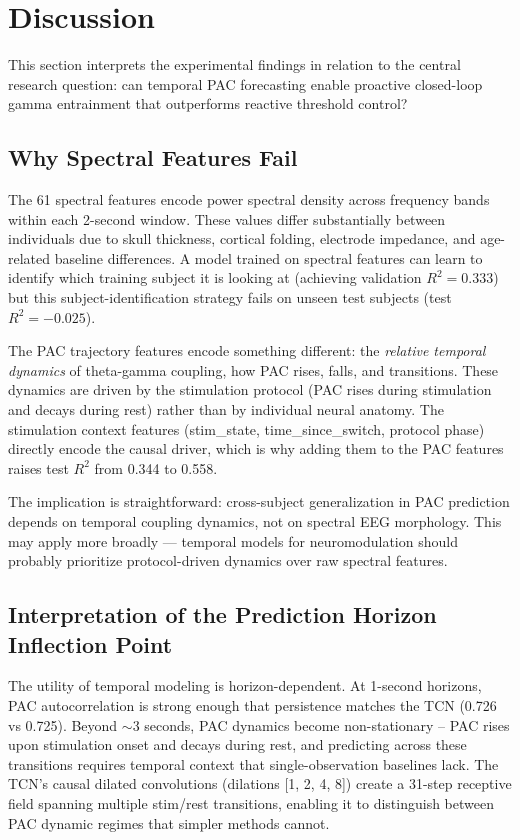 \documentclass[11pt,letterpaper]{article}
\begin{document}
\section{Discussion}

This section interprets the experimental findings in relation to the central research question: can temporal PAC forecasting enable proactive closed-loop gamma entrainment that outperforms reactive threshold control?

\subsection{Why Spectral Features Fail}

The 61 spectral features encode power spectral density across frequency bands within each 2-second window. These values differ substantially between individuals due to skull thickness, cortical folding, electrode impedance, and age-related baseline differences. A model trained on spectral features can learn to identify which training subject it is looking at (achieving validation $R^2 = 0.333$) but this subject-identification strategy fails on unseen test subjects (test $R^2 = -0.025$).

The PAC trajectory features encode something different: the \textit{relative temporal dynamics} of theta-gamma coupling, how PAC rises, falls, and transitions. These dynamics are driven by the stimulation protocol (PAC rises during stimulation and decays during rest) rather than by individual neural anatomy. The stimulation context features (stim\_state, time\_since\_switch, protocol phase) directly encode the causal driver, which is why adding them to the PAC features raises test $R^2$ from 0.344 to 0.558.

The implication is straightforward: cross-subject generalization in PAC prediction depends on temporal coupling dynamics, not on spectral EEG morphology. This may apply more broadly --- temporal models for neuromodulation should probably prioritize protocol-driven dynamics over raw spectral features.

\subsection{Interpretation of the Prediction Horizon Inflection Point}

The utility of temporal modeling is horizon-dependent. At 1-second horizons, PAC autocorrelation is strong enough that persistence matches the TCN (0.726 vs 0.725). Beyond $\sim$3 seconds, PAC dynamics become non-stationary -- PAC rises upon stimulation onset and decays during rest, and predicting across these transitions requires temporal context that single-observation baselines lack. The TCN's causal dilated convolutions (dilations [1, 2, 4, 8]) create a 31-step receptive field spanning multiple stim/rest transitions, enabling it to distinguish between PAC dynamic regimes that simpler methods cannot.
\end{document}
